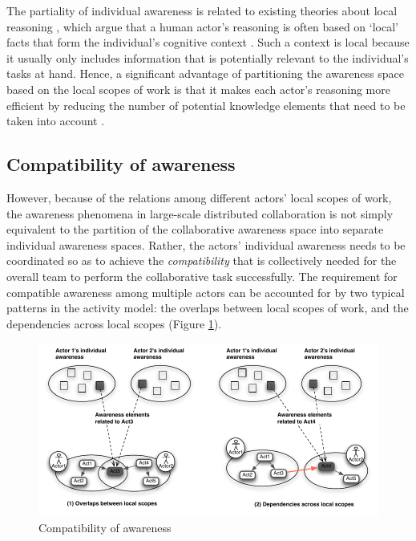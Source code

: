 The partiality of individual awareness is related to existing theories about local reasoning \cite{Benerecetti2000,ghidini2001local}, which argue that a human actor's reasoning is often based on `local' facts that form the individual's cognitive context \cite{Benerecetti2000}. Such a context is local because it usually only includes information that is potentially relevant to the individual's tasks at hand. Hence, a significant advantage of partitioning the awareness space based on the local scopes of work is that it makes each actor's reasoning more efficient by reducing the number of potential knowledge elements that need to be taken into account \cite{ghidini2001local}.  

\subsection{Compatibility of awareness} %
\label{sub:compatibility_of_awareness}
However, because of the relations among different actors' local scopes of work, the awareness phenomena in large-scale distributed collaboration is not simply equivalent to the partition of the collaborative awareness space into separate individual awareness spaces. Rather, the actors' individual awareness needs to be coordinated so as to achieve the \emph{compatibility} that is collectively needed for the overall team to perform the collaborative task successfully. The requirement for compatible awareness among multiple actors can be accounted for by two typical patterns in the activity model: the overlaps between local scopes of work, and the dependencies across local scopes (Figure \ref{fig:compatibility_of_awareness}).

\begin{figure}[htbp] %
   \centering
   \includegraphics{compatibility_of_awareness.pdf} 
   \caption{Compatibility of awareness}
   \label{fig:compatibility_of_awareness}
\end{figure}

